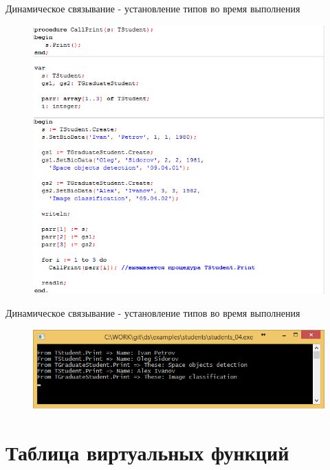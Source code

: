 \documentclass{beamer}
\begin{document}
\begin{frame}{Динамическое связывание - установление типов во время выполнения}
\begin{figure}[h]
\centering
\includegraphics[scale=0.4]{images/lec07-pic08.png}
\end{figure}
\end{frame}

\begin{frame}{Динамическое связывание - установление типов во время выполнения}
\begin{figure}[h]
\centering
\includegraphics[scale=0.4]{images/lec07-pic09.png}
\end{figure}
\end{frame}

\section{Таблица виртуальных функций}
\end{document}
